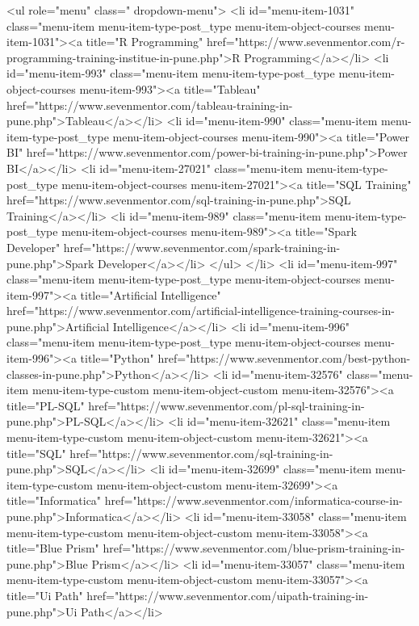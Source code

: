 {<ul role="menu" class=" dropdown-menu">
<li id="menu-item-1031" class="menu-item menu-item-type-post_type menu-item-object-courses menu-item-1031"><a title="R Programming" href="https://www.sevenmentor.com/r-programming-training-institue-in-pune.php">R Programming</a></li>
<li id="menu-item-993" class="menu-item menu-item-type-post_type menu-item-object-courses menu-item-993"><a title="Tableau" href="https://www.sevenmentor.com/tableau-training-in-pune.php">Tableau</a></li>
<li id="menu-item-990" class="menu-item menu-item-type-post_type menu-item-object-courses menu-item-990"><a title="Power BI" href="https://www.sevenmentor.com/power-bi-training-in-pune.php">Power BI</a></li>
<li id="menu-item-27021" class="menu-item menu-item-type-post_type menu-item-object-courses menu-item-27021"><a title="SQL Training" href="https://www.sevenmentor.com/sql-training-in-pune.php">SQL Training</a></li>
<li id="menu-item-989" class="menu-item menu-item-type-post_type menu-item-object-courses menu-item-989"><a title="Spark Developer" href="https://www.sevenmentor.com/spark-training-in-pune.php">Spark Developer</a></li>
</ul>
</li>
<li id="menu-item-997" class="menu-item menu-item-type-post_type menu-item-object-courses menu-item-997"><a title="Artificial Intelligence" href="https://www.sevenmentor.com/artificial-intelligence-training-courses-in-pune.php">Artificial Intelligence</a></li>
<li id="menu-item-996" class="menu-item menu-item-type-post_type menu-item-object-courses menu-item-996"><a title="Python" href="https://www.sevenmentor.com/best-python-classes-in-pune.php">Python</a></li>
<li id="menu-item-32576" class="menu-item menu-item-type-custom menu-item-object-custom menu-item-32576"><a title="PL-SQL" href="https://www.sevenmentor.com/pl-sql-training-in-pune.php">PL-SQL</a></li>
<li id="menu-item-32621" class="menu-item menu-item-type-custom menu-item-object-custom menu-item-32621"><a title="SQL" href="https://www.sevenmentor.com/sql-training-in-pune.php">SQL</a></li>
<li id="menu-item-32699" class="menu-item menu-item-type-custom menu-item-object-custom menu-item-32699"><a title="Informatica" href="https://www.sevenmentor.com/informatica-course-in-pune.php">Informatica</a></li>
<li id="menu-item-33058" class="menu-item menu-item-type-custom menu-item-object-custom menu-item-33058"><a title="Blue Prism" href="https://www.sevenmentor.com/blue-prism-training-in-pune.php">Blue Prism</a></li>
<li id="menu-item-33057" class="menu-item menu-item-type-custom menu-item-object-custom menu-item-33057"><a title="Ui Path" href="https://www.sevenmentor.com/uipath-training-in-pune.php">Ui Path</a></li>
}
